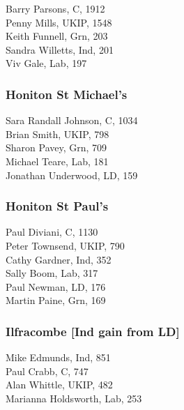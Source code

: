 \documentclass[a4paper,openany,10pt]{book}
\begin{document}
Barry Parsons, C, 1912\\
Penny Mills, UKIP, 1548\\
Keith Funnell, Grn, 203\\
Sandra Willetts, Ind, 201\\
Viv Gale, Lab, 197\\


\subsubsection*{Honiton St Michael's}



Sara Randall Johnson, C, 1034\\
Brian Smith, UKIP, 798\\
Sharon Pavey, Grn, 709\\
Michael Teare, Lab, 181\\
Jonathan Underwood, LD, 159\\


\subsubsection*{Honiton St Paul's}



Paul Diviani, C, 1130\\
Peter Townsend, UKIP, 790\\
Cathy Gardner, Ind, 352\\
Sally Boom, Lab, 317\\
Paul Newman, LD, 176\\
Martin Paine, Grn, 169\\


\subsubsection*{Ilfracombe \hspace*{\fill}\nolinebreak[1]%
\enspace\hspace*{\fill}
[Ind gain from LD]}



Mike Edmunds, Ind, 851\\
Paul Crabb, C, 747\\
Alan Whittle, UKIP, 482\\
Marianna Holdsworth, Lab, 253\\
\end{document}
